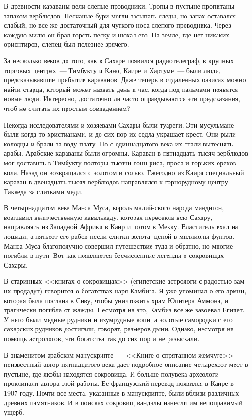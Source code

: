 \documentclass[12pt,a4paper,twoside,openany,svgnames]{memoir}
\begin{document}
В древности караваны вели слепые проводники. Тропы в пустыне пропитаны запахом верблюдов. Песчаные бури могли засыпать следы, но запах оставался~--- слабый, но все же достаточный для чуткого носа слепого проводника. Через каждую милю он брал горсть песку и нюхал его. На земле, где нет никаких ориентиров, слепец был полезнее зрячего.

За несколько веков до того, как в Сахаре появился радиотелеграф, в крупных торговых центрах~--- Тимбукту и Кано, Каире и Хартуме~--- были люди, предсказывавшие прибытие караванов. Даже теперь в отдаленных оазисах можно найти старца, который может назвать день и час, когда под пальмами появятся новые люди. Интересно, достаточно ли часто оправдываются эти предсказания, чтоб не считать их простым совпадением?

Некогда исследователями и хозяевами Сахары были туареги. Эти мусульмане были когда-то христианами, и до сих пор их седла украшает крест. Они рыли колодцы и брали за воду плату. Но с одиннадцатого века их стали вытеснять арабы. Арабские караваны были огромны. Караван в пятнадцать тысяч верблюдов мог доставить в Тимбукту полторы тысячи тонн риса, проса и горьких орехов кола. Назад он возвращался с золотом и солью. Ежегодно из Каира специальный караван в двенадцать тысяч верблюдов направлялся к горнорудному центру Таккеда за слитками меди.

В четырнадцатом веке Манса Муса, король малий-ского народа мандигон, возглавил величественную кавалькаду, которая пересекла всю Сахару, направляясь из Западной Африки в Каир и потом в Мекку. Властитель ехал на лошади, а пятьсот его рабов несли слитки золота, ценой в миллионы фунтов. Манса Муса благополучно совершил путешествие туда и обратно, но многие погибли в пути. Вот как появляются бесчисленные легенды о сокровищах Сахары.

В старинных <<книгах о сокровищах>> (египетские астрологи с радостью вам их продадут) говорится о богатствах царя Камбиза. Я уже упоминал о его армии, которая была послана в Сиву, чтобы уничтожить храм Юпитера Аммона, и трагически погибла от жажды. Несмотря на это, Камбиз все же завоевал Египет. У него были медные рудники и изумрудные копи, а золотые самородки с его сахарских рудников достигали, говорят, размеров дыни. Однако, несмотря на помощь астрологов, эти богатства так до сих пор и не разыскали.

В знаменитом арабском манускрипте~--- <<Книге о спрятанном жемчуге>> неизвестный автор пятнадцатого века дает подробное описание четырехсот мест в пустыне, где якобы находятся сокровища. И больше полувека археологи проклинали автора этой работы. Ее французский перевод появился в Каире в 1907 году. Почти все места, указанные в манускрипте, были вблизи различных древних памятников. И в поисках сокровищ вандалы нанесли им непоправимый ущерб.
\end{document}
